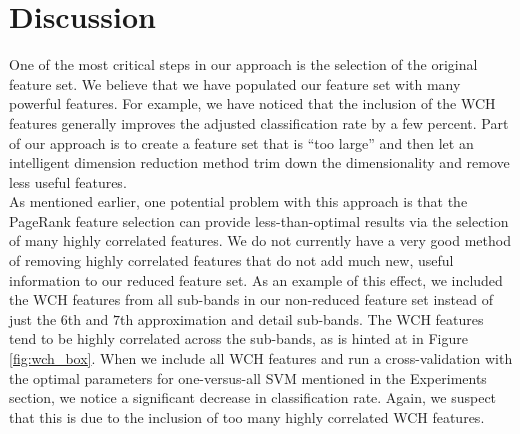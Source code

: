 \documentclass[12pt]{article}
\begin{document}
\section{Discussion}

One of the most critical steps in our approach is the selection of the original feature set.  We believe that we have populated our feature set with many powerful features.  For example, we have noticed that the inclusion of the WCH features generally improves the adjusted classification rate by a few percent.  Part of our approach is to create a feature set that is ``too large'' and then let an intelligent dimension reduction method trim down the dimensionality and remove less useful features.\\

As mentioned earlier, one potential problem with this approach is that the PageRank feature selection can provide less-than-optimal results via the selection of many highly correlated features.  We do not currently have a very good method of removing highly correlated features that do not add much new, useful information to our reduced feature set.  As an example of this effect, we included the WCH features from all sub-bands in our non-reduced feature set instead of just the $6$th and $7$th approximation and detail sub-bands.  The WCH features tend to be highly correlated across the sub-bands, as is hinted at in Figure \ref{fig:wch_box}.  When we include all WCH features and run a cross-validation with the optimal parameters for one-versus-all SVM mentioned in the Experiments section, we notice a significant decrease in classification rate.  Again, we suspect that this is due to the inclusion of too many highly correlated WCH features.\\









\end{document}
